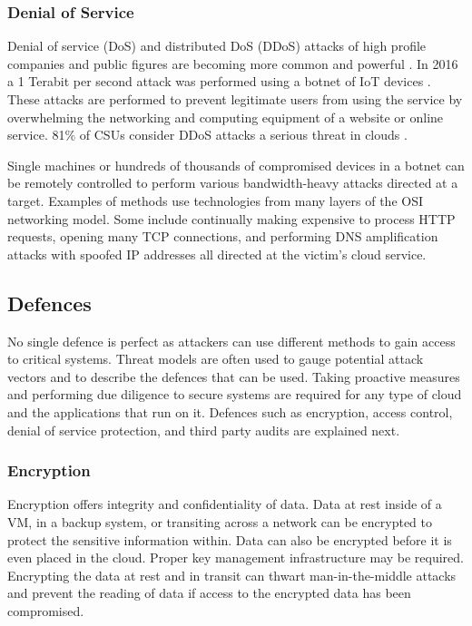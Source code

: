 \documentclass[12pt]{article}
\begin{document}
\subsubsection{Denial of Service}

Denial of service (DoS) and distributed DoS (DDoS) attacks of high profile companies and public figures are becoming more common and powerful \cite{verisignddos}. In 2016 a 1 Terabit per second attack was performed using a botnet of IoT devices \cite{arsddos}. These attacks are performed to prevent legitimate users from using the service by overwhelming the networking and computing equipment of a website or online service. 81\% of CSUs consider DDoS attacks a serious threat in clouds \cite{top2013notorious}.

Single machines or hundreds of thousands of compromised devices in a botnet can be remotely controlled to perform various bandwidth-heavy attacks directed at a target. Examples of methods use technologies from many layers of the OSI networking model. Some include continually making expensive to process HTTP requests, opening many TCP connections, and performing DNS amplification attacks with spoofed IP addresses all directed at the victim's cloud service.






\subsection{Defences}

No single defence is perfect as attackers can use different methods to gain access to critical systems. Threat models are often used to gauge potential attack vectors and to describe the defences that can be used. Taking proactive measures and performing due diligence to secure systems are required for any type of cloud and the applications that run on it. Defences such as encryption, access control, denial of service protection, and third party audits are explained next.

\subsubsection{Encryption}

Encryption offers integrity and confidentiality of data. Data at rest inside of a VM, in a backup system, or transiting across a network can be encrypted to protect the sensitive information within. Data can also be encrypted before it is even placed in the cloud. Proper key management infrastructure may be required. Encrypting the data at rest and in transit can thwart man-in-the-middle attacks and prevent the reading of data if access to the encrypted data has been compromised.
\end{document}
